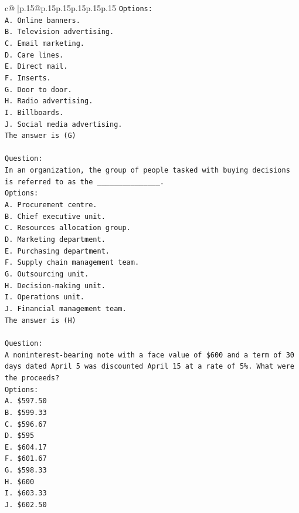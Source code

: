 \documentclass{article}
\begin{document}
{\begin{supertabular}{c@{$\;$}|p{.15\linewidth}@{}p{.15\linewidth}p{.15\linewidth}p{.15\linewidth}p{.15\linewidth}p{.15\linewidth}}
{{{\texttt{Options:} \\
\texttt{A. Online banners.} \\
\texttt{B. Television advertising.} \\
\texttt{C. Email marketing.} \\
\texttt{D. Care lines.} \\
\texttt{E. Direct mail.} \\
\texttt{F. Inserts.} \\
\texttt{G. Door to door.} \\
\texttt{H. Radio advertising.} \\
\texttt{I. Billboards.} \\
\texttt{J. Social media advertising.} \\
\texttt{The answer is (G)} \\
\\ 
\texttt{Question:} \\
\texttt{In an organization, the group of people tasked with buying decisions is referred to as the \_\_\_\_\_\_\_\_\_\_\_\_\_\_\_.} \\
\texttt{Options:} \\
\texttt{A. Procurement centre.} \\
\texttt{B. Chief executive unit.} \\
\texttt{C. Resources allocation group.} \\
\texttt{D. Marketing department.} \\
\texttt{E. Purchasing department.} \\
\texttt{F. Supply chain management team.} \\
\texttt{G. Outsourcing unit.} \\
\texttt{H. Decision{-}making unit.} \\
\texttt{I. Operations unit.} \\
\texttt{J. Financial management team.} \\
\texttt{The answer is (H)} \\
\\ 
\texttt{Question:} \\
\texttt{A noninterest{-}bearing note with a face value of \$600 and a term of 30 days dated April 5 was discounted April 15 at a rate of 5\%. What were the proceeds?} \\
\texttt{Options:} \\
\texttt{A. \$597.50} \\
\texttt{B. \$599.33} \\
\texttt{C. \$596.67} \\
\texttt{D. \$595} \\
\texttt{E. \$604.17} \\
\texttt{F. \$601.67} \\
\texttt{G. \$598.33} \\
\texttt{H. \$600} \\
\texttt{I. \$603.33} \\
\texttt{J. \$602.50} \\
            }
        }
    }
     \\ \\


\end{supertabular}}
\end{document}
